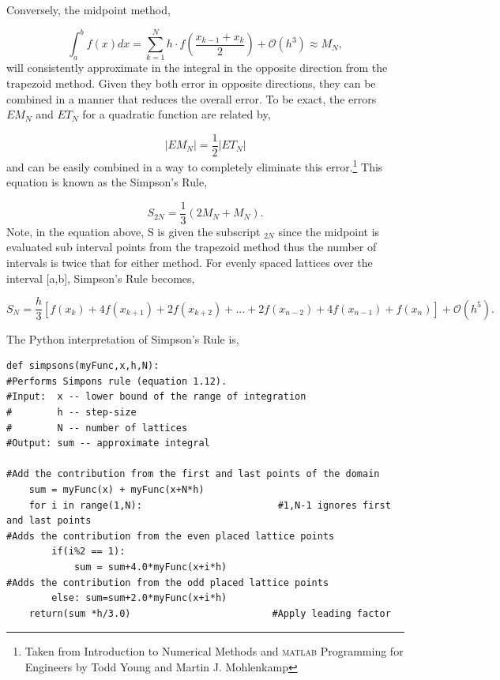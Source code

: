 \documentclass[10pt]{article}
\begin{document}
Conversely, the midpoint method,

\begin{equation}
	\label{eq:midpoint}
	\int^b_a f(x)dx = \sum^N_{k=1} h\cdot f\left(\frac{x_{k-1}+x_k}{2}\right) + \mathcal{O}(h^3) \approx M_N,
\end{equation}
will consistently approximate in the integral in the opposite direction from the trapezoid method. Given they both error in opposite directions, they can be combined in a manner that reduces the overall error. To be exact, the errors $EM_N$ and $ET_N$ for a quadratic function are related by,

\[
	|EM_N| = \frac{1}{2}|ET_N|
\]
and can be easily combined in a way to completely eliminate this error.\footnote{Taken from Introduction to Numerical Methods and \textsc{matlab} Programming for Engineers by Todd Young and Martin J. Mohlenkamp} This equation is known as the Simpson's Rule, 

\[
	S_{2N} = \frac{1}{3}(2M_N + M_N).
\]
Note, in the equation above, S is given the subscript $_{2N}$ since the midpoint is evaluated sub interval points from the trapezoid method thus the number of intervals is twice that for either method. For evenly spaced lattices over the interval [a,b], Simpson's Rule becomes,

\begin{equation}
	\label{eq:simpson}
	S_N = \frac{h}{3}[f(x_k)+4f(x_{k+1})+2f(x_{k+2})+...+2f(x_{n-2})+4f(x_{n-1})+f(x_n)] + \mathcal{O}(h^5).
\end{equation}

The Python interpretation of Simpson's Rule is,
\begin{lstlisting}   
def simpsons(myFunc,x,h,N):
#Performs Simpons rule (equation 1.12).
#Input:  x -- lower bound of the range of integration
#        h -- step-size
#        N -- number of lattices
#Output: sum -- approximate integral
    
#Add the contribution from the first and last points of the domain
    sum = myFunc(x) + myFunc(x+N*h)
    for i in range(1,N):                        #1,N-1 ignores first and last points
#Adds the contribution from the even placed lattice points        
        if(i%2 == 1):
            sum = sum+4.0*myFunc(x+i*h)
#Adds the contribution from the odd placed lattice points            
        else: sum=sum+2.0*myFunc(x+i*h)                               
    return(sum *h/3.0)                         #Apply leading factor
\end{lstlisting}
\end{document}
